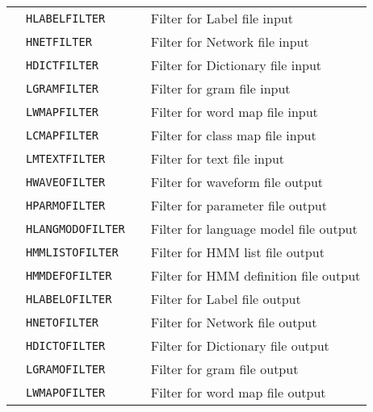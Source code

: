 \begin{center}
\begin{supertabular}{|p{1.8cm}|l|l|p{6.6cm}|}
 & \texttt{HLABELFILTER}   & & Filter for Label file input\\ 


 & \texttt{HNETFILTER}     & & Filter for Network file input\\ 


 & \texttt{HDICTFILTER}    & & Filter for Dictionary file input \\  


 & \texttt{LGRAMFILTER}    & & Filter for gram file input\\ 


 & \texttt{LWMAPFILTER}    & & Filter for word map file input\\ 


 & \texttt{LCMAPFILTER}    & &  Filter for class map file input\\ 


 & \texttt{LMTEXTFILTER}   & & Filter for text file input\\ 


 & \texttt{HWAVEOFILTER}   & & Filter for waveform file output\\ 


 & \texttt{HPARMOFILTER}   & & Filter for parameter file output\\ 


 & \texttt{HLANGMODOFILTER}& & Filter for language model file output\\ 


 & \texttt{HMMLISTOFILTER} & & Filter for HMM list file output\\ 


 & \texttt{HMMDEFOFILTER}  & & Filter for HMM definition file output\\ 


 & \texttt{HLABELOFILTER}  & & Filter for Label file output\\ 


 & \texttt{HNETOFILTER}    & & Filter for Network file output\\ 


 & \texttt{HDICTOFILTER}   & & Filter for Dictionary file output \\  


 & \texttt{LGRAMOFILTER}   & & Filter for gram file output\\ 


 & \texttt{LWMAPOFILTER}   & & Filter for word map file output\\ 



\end{supertabular}
\end{center}
